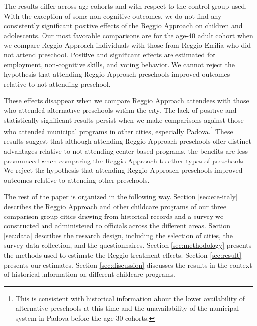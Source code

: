 The results differ across age cohorts and with respect to the control group used. With the exception of some non-cognitive outcomes, we do not find any consistently significant positive effects of the Reggio Approach on children and adolescents. Our most favorable comparisons are for the age-40 adult cohort when we compare Reggio Approach individuals with those from Reggio Emilia who did not attend preschool. Positive and significant effects are estimated for employment, non-cognitive skills, and voting behavior. We cannot reject the hypothesis that attending Reggio Approach preschools improved outcomes relative to not attending preschool.

These effects disappear when we compare Reggio Approach attendees with those who attended alternative preschools within the city. The lack of positive and statistically significant results persist when we make comparisons against those who attended municipal programs in other cities, especially Padova.\footnote{This is consistent with historical information about the lower availability of alternative preschools at this time and the unavailability of the municipal system in Padova before the age-30 cohorts.} These results suggest that although attending Reggio Approach preschools offer distinct advantages relative to not attending center-based programs, the benefits are less pronounced when comparing the Reggio Approach to other types of preschools. We reject the hypothesis that attending Reggio Approach preschools improved outcomes relative to attending other preschools.

The rest of the paper is organized in the following way. Section \ref{sec:ece-italy} describes the Reggio Approach and other childcare programs of our three comparison group cities drawing from historical records and a survey we constructed and administered to officials across the different areas. Section \ref{sec:data} describes the research design, including the selection of cities, the survey data collection, and the questionnaires. Section \ref{sec:methodology} presents the methods used to estimate the Reggio treatment effects. Section \ref{sec:result} presents our estimates. Section \ref{sec:discussion} discusses the results in the context of historical information on different childcare programs.


